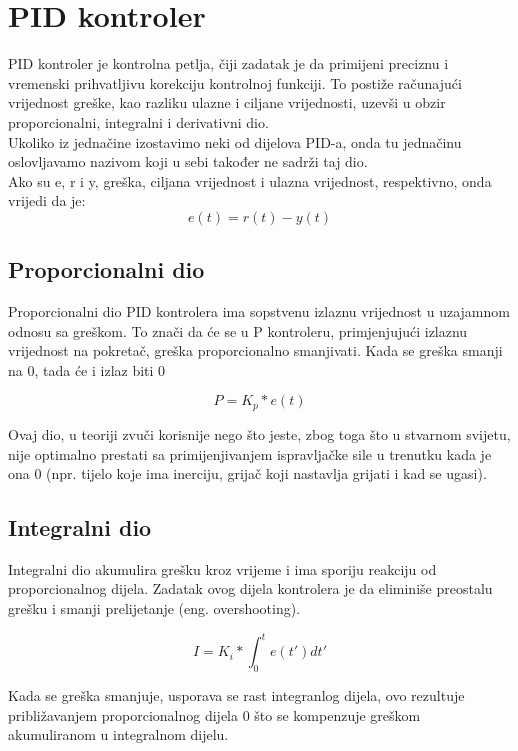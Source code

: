\documentclass[../Document.tex]{subfiles}
\begin{document}
\section{PID kontroler}
PID kontroler je kontrolna petlja, čiji zadatak je da primijeni preciznu i vremenski prihvatljivu korekciju kontrolnoj funkciji. To postiže računajući vrijednost greške, kao razliku ulazne i ciljane vrijednosti, uzevši u obzir proporcionalni, integralni i derivativni dio.\\

\noindent Ukoliko iz jednačine izostavimo neki od dijelova PID-a, onda tu jednačinu oslovljavamo nazivom koji u sebi također ne sadrži taj dio.
\\

\noindent Ako su e, r i y, greška, ciljana vrijednost i ulazna vrijednost, respektivno, onda vrijedi da je:
$$
    e(t) = r(t) - y(t)
$$
\subsection{Proporcionalni dio}
Proporcionalni dio PID kontrolera ima sopstvenu izlaznu vrijednost u uzajamnom odnosu sa greškom. To znači da će se u P kontroleru, primjenjujući izlaznu vrijednost na pokretač, greška proporcionalno smanjivati. Kada se greška smanji na 0, tada će i izlaz biti 0

$$
    P=K_p*e(t)
$$

\noindent Ovaj dio, u teoriji zvuči korisnije nego što jeste, zbog toga što u stvarnom svijetu, nije optimalno prestati sa primijenjivanjem ispravljačke sile u trenutku kada je ona 0 (npr. tijelo koje ima inerciju, grijač koji nastavlja grijati i kad se ugasi).


\subsection{Integralni dio}
Integralni dio akumulira grešku kroz vrijeme i ima sporiju reakciju od proporcionalnog dijela. Zadatak ovog dijela kontrolera je da eliminiše preostalu grešku i smanji prelijetanje (eng. overshooting).

$$
    I=K_i*\int_{0}^{t}e(t')dt'
$$

\noindent Kada se greška smanjuje, usporava se rast integranlog dijela, ovo rezultuje približavanjem proporcionalnog dijela 0 što se kompenzuje greškom akumuliranom u integralnom dijelu.

\end{document}

